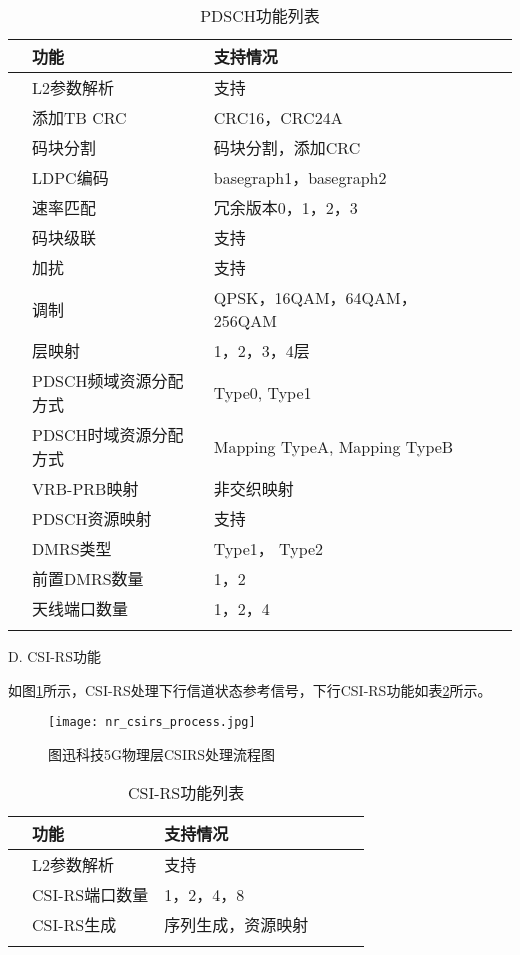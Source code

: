 \begin{table}[h]
    \centering
    \caption{PDSCH功能列表}
    \label{T.1_4}
    \begin{tabular}{llllll}
        \hline
          & 功能   & 支持情况 \\
        \hline
          & L2参数解析 & 支持 \\
        \hline
          & 添加TB CRC & CRC16，CRC24A \\
        \hline
          & 码块分割 & 码块分割，添加CRC\\
        \hline
          & LDPC编码 & basegraph1，basegraph2 \\
        \hline
          & 速率匹配 &  冗余版本0，1，2，3 \\
        \hline
          & 码块级联 &  支持 \\
        \hline
          & 加扰 &  支持 \\
        \hline
          & 调制 &  QPSK，16QAM，64QAM，256QAM \\
        \hline
          & 层映射 &  1，2，3，4层\\
        \hline
          & PDSCH频域资源分配方式 &  Type0, Type1\\
        \hline
          & PDSCH时域资源分配方式 &  Mapping TypeA, Mapping TypeB\\
        \hline
          & VRB-PRB映射 &  非交织映射\\
        \hline
          & PDSCH资源映射 &  支持\\
        \hline
          & DMRS类型 &  Type1， Type2\\
        \hline
          & 前置DMRS数量 & 1，2\\
        \hline
          & 天线端口数量 & 1，2，4\\
        \hline{}
    \end{tabular}
\end{table}

D. CSI-RS功能

\par
{} %
\setlength{\hangindent}{2em}
如图\ref{F.1_6}所示，CSI-RS处理下行信道状态参考信号，下行CSI-RS功能如表\ref{T.1_5}所示。

\begin{figure}[H]
  \centering
  \texttt{[image: nr\_csirs\_process.jpg]}
  \caption{图迅科技5G物理层CSIRS处理流程图}
  \label{F.1_6}
\end{figure}

\begin{table}[!htbp]
    \centering
    \caption{CSI-RS功能列表}
    \label{T.1_5}
    \begin{tabular}{llllll}
        \hline
          & 功能   & 支持情况 \\
        \hline
          & L2参数解析 & 支持 \\
        \hline
          & CSI-RS端口数量 & 1，2，4，8 \\
        \hline
          & CSI-RS生成 & 序列生成，资源映射\\
        \hline{}
    \end{tabular}
\end{table}

